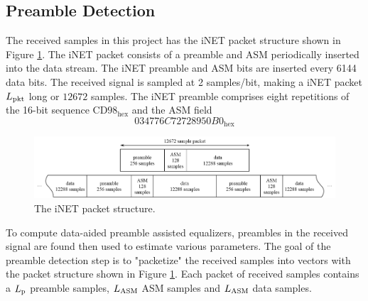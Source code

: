\subsection{Preamble Detection}
\label{sec:preamble_detection}
The received samples in this project has the iNET packet structure shown in Figure \ref{fig:packet}.
The iNET packet consists of a preamble and ASM periodically inserted into the data stream.
The iNET preamble and ASM bits are inserted every 6144 data bits.
The received signal is sampled at 2 samples/bit, making a iNET packet $L_\text{pkt}$ long or $12672$ samples.
The iNET preamble comprises eight repetitions of the 16-bit sequence $\text{CD98}_\text{hex}$ and the ASM field
\begin{equation}
034776C72728950B0_\text{hex}
\end{equation}
\begin{figure}
	\centering\includegraphics[width=\textwidth/10*11]{figures/gpu/packet.png}
	\caption{The iNET packet structure.}
	\label{fig:packet}
\end{figure}

To compute data-aided preamble assisted equalizers, preambles in the received signal are found then used to estimate various parameters.
The goal of the preamble detection step is to "packetize" the received samples into vectors with the packet structure shown in Figure \ref{fig:packet}. Each packet of received samples contains a $L_\text{p}$ preamble samples, $L_\text{ASM}$ ASM samples and $L_\text{ASM}$ data samples.

